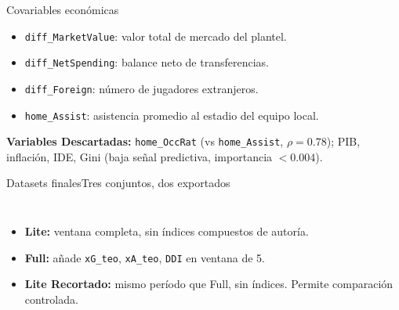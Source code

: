 \documentclass[aspectratio=169,11pt]{beamer}
\begin{document}
\begin{frame}{Covariables econ\'omicas}{}
	\footnotesize
	\begin{itemize}
		\item \texttt{diff\_MarketValue}: valor total de mercado del plantel.
		\item \texttt{diff\_NetSpending}: balance neto de transferencias.
		\item \texttt{diff\_Foreign}: número de jugadores extranjeros.
		\item \texttt{home\_Assist}: asistencia promedio al estadio del equipo local.
	\end{itemize}
	\footnotesize \textbf{Variables Descartadas:} \texttt{home\_OccRat} (vs \texttt{home\_Assist}, $\rho = 0{.}78$); PIB, inflaci\'on, IDE, Gini (baja señal predictiva, importancia $< 0{.}004$).
\end{frame}

\begin{frame}{Datasets finales}{Tres conjuntos, dos exportados}
	\begin{columns}[T,onlytextwidth]
		\centering
		\small
		\renewcommand{\arraystretch}{1.4}
		\begin{minipage}{0.85\textwidth}
			\footnotesize
			\begin{itemize}
				\item \textbf{Lite:} ventana completa, sin \'indices compuestos de autor\'ia.
				\item \textbf{Full:} a\~nade \texttt{xG\_teo}, \texttt{xA\_teo}, \texttt{DDI} en ventana de 5.
				\item \textbf{Lite Recortado:} mismo per\'iodo que Full, sin \'indices. Permite comparaci\'on controlada.
			\end{itemize}
		\end{minipage}
	\end{columns}
\end{frame}
\end{document}
